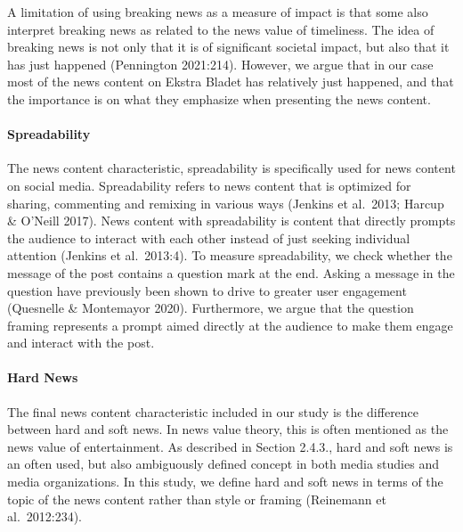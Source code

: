 \documentclass[
]{article}
\begin{document}
A limitation of using breaking news as a measure of impact is that some
also interpret breaking news as related to the news value of timeliness.
The idea of breaking news is not only that it is of significant societal
impact, but also that it has just happened (Pennington 2021:214).
However, we argue that in our case most of the news content on Ekstra
Bladet has relatively just happened, and that the importance is on what
they emphasize when presenting the news content.

\hypertarget{spreadability}{%
\paragraph*{Spreadability}\label{spreadability}}

\hspace{-2.5em}

\noindent The news content characteristic, spreadability is specifically
used for news content on social media. Spreadability refers to news
content that is optimized for sharing, commenting and remixing in
various ways (Jenkins et al.~2013; Harcup \& O'Neill 2017). News content
with spreadability is content that directly prompts the audience to
interact with each other instead of just seeking individual attention
(Jenkins et al.~2013:4). To measure spreadability, we check whether the
message of the post contains a question mark at the end. Asking a
message in the question have previously been shown to drive to greater
user engagement (Quesnelle \& Montemayor 2020). Furthermore, we argue
that the question framing represents a prompt aimed directly at the
audience to make them engage and interact with the post.

\hypertarget{hard-news}{%
\paragraph*{Hard News}\label{hard-news}}

\hspace{-2.5em}

\noindent The final news content characteristic included in our study is
the difference between hard and soft news. In news value theory, this is
often mentioned as the news value of entertainment. As described in
Section 2.4.3., hard and soft news is an often used, but also
ambiguously defined concept in both media studies and media
organizations. In this study, we define hard and soft news in terms of
the topic of the news content rather than style or framing (Reinemann et
al.~2012:234).
\end{document}
